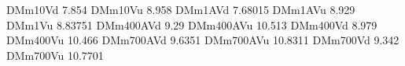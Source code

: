 DMm10Vd 7.854
DMm10Vu 8.958
DMm1AVd 7.68015
DMm1AVu 8.929
DMm1Vu 8.83751
DMm400AVd 9.29
DMm400AVu 10.513
DMm400Vd 8.979
DMm400Vu 10.466
DMm700AVd 9.6351
DMm700AVu 10.8311
DMm700Vd 9.342
DMm700Vu 10.7701
